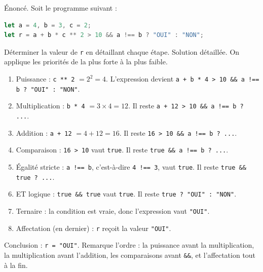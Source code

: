 \documentclass[11pt]{article}
\begin{document}
\begin{exoresolu}
Énoncé. Soit le programme suivant :
\begin{lstlisting}[language=JavaScript]
let a = 4, b = 3, c = 2;
let r = a + b * c ** 2 > 10 && a !== b ? "OUI" : "NON";
\end{lstlisting}
Déterminer la valeur de \texttt{r} en détaillant chaque étape.
\tcblower
Solution détaillée. On applique les priorités de la plus forte à la plus faible.
\begin{enumerate}
\item Puissance : \texttt{c ** 2} $= 2^2 = 4$. L'expression devient \texttt{a + b * 4 > 10 \&\& a !== b ? "OUI" : "NON"}.
\item Multiplication : \texttt{b * 4} $= 3 \times 4 = 12$. Il reste \texttt{a + 12 > 10 \&\& a !== b ? ...}.
\item Addition : \texttt{a + 12} $= 4 + 12 = 16$. Il reste \texttt{16 > 10 \&\& a !== b ? ...}.
\item Comparaison : \texttt{16 > 10} vaut \texttt{true}. Il reste \texttt{true \&\& a !== b ? ...}.
\item Égalité stricte : \texttt{a !== b}, c'est-à-dire \texttt{4 !== 3}, vaut \texttt{true}. Il reste \texttt{true \&\& true ? ...}.
\item ET logique : \texttt{true \&\& true} vaut \texttt{true}. Il reste \texttt{true ? "OUI" : "NON"}.
\item Ternaire : la condition est vraie, donc l'expression vaut \texttt{"OUI"}.
\item Affectation (en dernier) : \texttt{r} reçoit la valeur \texttt{"OUI"}.
\end{enumerate}
Conclusion : \texttt{r = "OUI"}. Remarque l'ordre : la puissance avant la multiplication, la multiplication avant l'addition, les comparaisons avant \texttt{\&\&}, et l'affectation tout à la fin.
\end{exoresolu}
\end{document}

